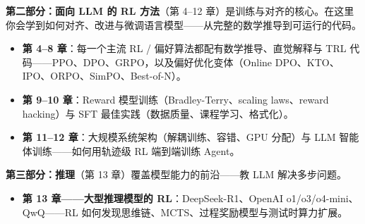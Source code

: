 \documentclass[11pt,a4paper,openany]{book}
\begin{document}
\textbf{第二部分：面向 LLM 的 RL 方法}（第 4--12 章）是训练与对齐的核心。在这里你会学到如何对齐、改进与微调语言模型——从完整的数学推导到可运行的代码。

\begin{itemize}
  \item \textbf{第 4--8 章}：每一个主流 RL / 偏好算法都配有数学推导、直觉解释与 TRL 代码——PPO、DPO、GRPO，以及偏好优化变体（Online DPO、KTO、IPO、ORPO、SimPO、Best-of-N）。
  \item \textbf{第 9--10 章}：Reward 模型训练（Bradley-Terry、scaling laws、reward hacking）与 SFT 最佳实践（数据质量、课程学习、格式化）。
  \item \textbf{第 11--12 章}：大规模系统架构（解耦训练、容错、GPU 分配）与 LLM 智能体训练——如何用轨迹级 RL 端到端训练 Agent。
\end{itemize}

\textbf{第三部分：推理}（第 13 章）覆盖模型能力的前沿——教 LLM 解决多步问题。

\begin{itemize}
  \item \textbf{第 13 章——大型推理模型的 RL}：DeepSeek-R1、OpenAI o1/o3/o4-mini、QwQ——RL 如何发现思维链、MCTS、过程奖励模型与测试时算力扩展。
\end{itemize}
\end{document}
